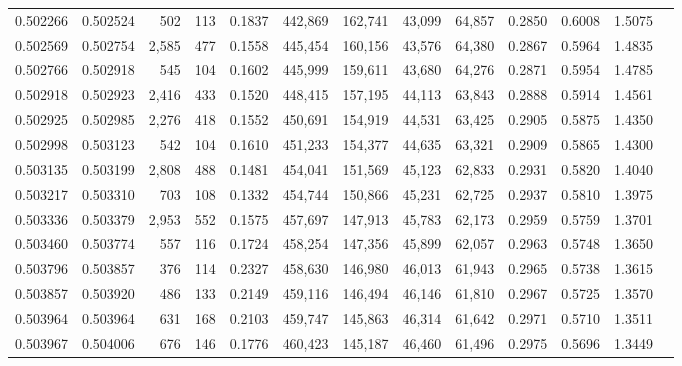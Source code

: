\begin{tabular}{rrrrrrrrrrrrr}
0.502266 & 0.502524 &   502 &   113 &                                     0.1837 & 442,869 & 162,741 &  43,099 &  64,857 & 0.2850 & 0.6008 & 1.5075 \\
0.502569 & 0.502754 & 2,585 &   477 &                                     0.1558 & 445,454 & 160,156 &  43,576 &  64,380 & 0.2867 & 0.5964 & 1.4835 \\
0.502766 & 0.502918 &   545 &   104 &                                     0.1602 & 445,999 & 159,611 &  43,680 &  64,276 & 0.2871 & 0.5954 & 1.4785 \\
0.502918 & 0.502923 & 2,416 &   433 &                                     0.1520 & 448,415 & 157,195 &  44,113 &  63,843 & 0.2888 & 0.5914 & 1.4561 \\
0.502925 & 0.502985 & 2,276 &   418 &                                     0.1552 & 450,691 & 154,919 &  44,531 &  63,425 & 0.2905 & 0.5875 & 1.4350 \\
0.502998 & 0.503123 &   542 &   104 &                                     0.1610 & 451,233 & 154,377 &  44,635 &  63,321 & 0.2909 & 0.5865 & 1.4300 \\
0.503135 & 0.503199 & 2,808 &   488 &                                     0.1481 & 454,041 & 151,569 &  45,123 &  62,833 & 0.2931 & 0.5820 & 1.4040 \\
0.503217 & 0.503310 &   703 &   108 &                                     0.1332 & 454,744 & 150,866 &  45,231 &  62,725 & 0.2937 & 0.5810 & 1.3975 \\
0.503336 & 0.503379 & 2,953 &   552 &                                     0.1575 & 457,697 & 147,913 &  45,783 &  62,173 & 0.2959 & 0.5759 & 1.3701 \\
0.503460 & 0.503774 &   557 &   116 &                                     0.1724 & 458,254 & 147,356 &  45,899 &  62,057 & 0.2963 & 0.5748 & 1.3650 \\
0.503796 & 0.503857 &   376 &   114 &                                     0.2327 & 458,630 & 146,980 &  46,013 &  61,943 & 0.2965 & 0.5738 & 1.3615 \\
0.503857 & 0.503920 &   486 &   133 &                                     0.2149 & 459,116 & 146,494 &  46,146 &  61,810 & 0.2967 & 0.5725 & 1.3570 \\
0.503964 & 0.503964 &   631 &   168 &                                     0.2103 & 459,747 & 145,863 &  46,314 &  61,642 & 0.2971 & 0.5710 & 1.3511 \\
0.503967 & 0.504006 &   676 &   146 &                                     0.1776 & 460,423 & 145,187 &  46,460 &  61,496 & 0.2975 & 0.5696 & 1.3449 \\

\end{tabular}
